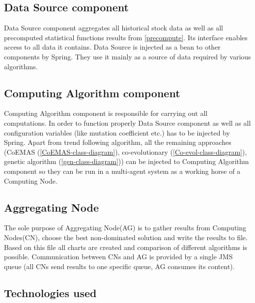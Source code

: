 \subsection{Data Source component}
\label{dataSource}

Data Source component aggregates all historical stock data as well as all precomputed statistical functions results from \ref{precompute}.   
Its interface enables access to all data it contains. Data Source is injected as a bean to other components by Spring.
They use it mainly as a source of data required by various algorithms.

\subsection{Computing Algorithm component}

Computing Algorithm component is responsible for carrying out all computations.
In order to function properly Data Source component as well as all configuration variables (like mutation coefficient etc.) has to be injected by Spring.
Apart from trend following algorithm, all the remaining approaches (CoEMAS (\ref{CoEMAS-class-diagram}), co-evolutionary (\ref{Co-evol-class-diagram}),
 genetic algorithm (\ref{gen-class-diagram})) can be injected to Computing Algorithm component so they can be run
 in a multi-agent system as a working horse of a Computing Node.


\subsection{Aggregating Node}

The sole purpose of Aggregating Node(AG) is to gather results from Computing Nodes(CN), choose the best non-dominated solution and write the results to file. 
Based on this file all charts are created and comparison of different algorithms is possible.
Communication between CNs and AG is provided by a single JMS queue (all CNs send results to one specific queue, AG consumes its content).


\subsection{Technologies used}

